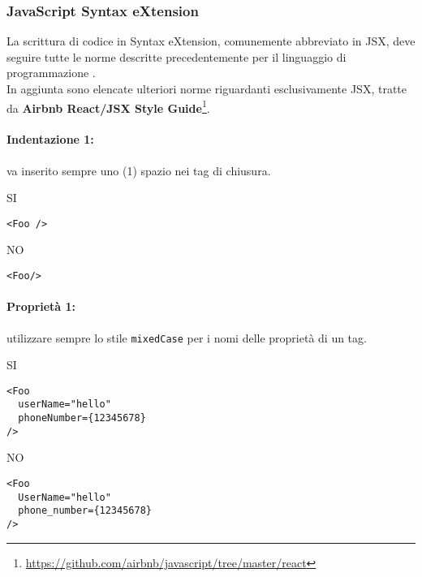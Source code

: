 \documentclass[../ProcessiPrimari.tex]{subfiles}
\begin{document}
	
	\subsubsection{JavaScript Syntax eXtension}
	La scrittura di codice in  Syntax eXtension, comunemente abbreviato in JSX, deve seguire tutte le norme descritte precedentemente per il linguaggio di programmazione .\\
	In aggiunta sono elencate ulteriori norme riguardanti esclusivamente JSX, tratte da \textbf{Airbnb React/JSX Style Guide}\footnote{\href{https://github.com/airbnb/javascript/tree/master/react}{https://github.com/airbnb/javascript/tree/master/react}}. 

	\paragraph*{Indentazione 1: }
	va inserito sempre uno (1) spazio nei tag di chiusura.	
	\begin{center}{	
			\begin{minipage}{3cm}
				{\begin{center}SI\end{center}}
				\begin{Verbatim}[frame=single]
<Foo />
				\end{Verbatim}
			\end{minipage}
			\hfil
			\begin{minipage}{3cm}
				{\begin{center}NO\end{center}}
				\begin{Verbatim}[frame=single]
<Foo/>
				\end{Verbatim}
			\end{minipage}
		}
	\end{center}	
	\paragraph*{Proprietà 1: }
utilizzare sempre lo stile \texttt{mixedCase} per i nomi delle proprietà di un tag. 
	\begin{center}{
			\begin{minipage}{6cm}
				{\begin{center}SI\end{center}}
				\begin{Verbatim}[frame=single]
<Foo
  userName="hello"
  phoneNumber={12345678}
/>
				\end{Verbatim}
			\end{minipage}
			\hfil
			\begin{minipage}{6cm}
				{\begin{center}NO\end{center}}
				\begin{Verbatim}[frame=single]
<Foo
  UserName="hello"
  phone_number={12345678}
/>
				\end{Verbatim}
			\end{minipage}
		}
	\end{center}
\end{document}
